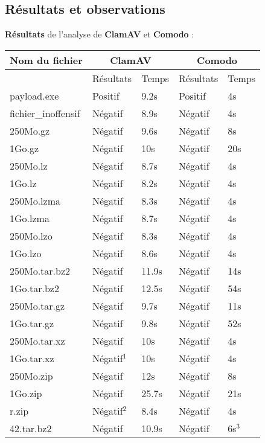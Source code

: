 \documentclass[smallextended]{svjour3}       %
\begin{document}
\subsection{Résultats et observations}
\label{3.2résultats}
\textbf{Résultats} de l'analyse de \textbf{ClamAV} et \textbf{Comodo} :\\
$ $\\
\begin{tabular}{|l|l|l|l|l|}
  \hline
  \textbf{Nom du fichier} & \multicolumn{2}{|c|}{\textbf{ClamAV}} & \multicolumn{2}{|c|}{\textbf{Comodo}}\\
  \hline
   & Résultats & Temps & Résultats & Temps \\
  \hline
  \hline
payload.exe & Positif & 9.2s & Positif & 4s\\
	\hline
fichier\_inoffensif & Négatif & 8.9s & Négatif & 4s\\
	\hline
	\hline
250Mo.gz &  Négatif  & 9.6s & Négatif & 8s\\
	\hline
1Go.gz &  Négatif  & 10s & Négatif & 20s\\
    \hline
    \hline
250Mo.lz &  Négatif  & 8.7s & Négatif & 4s\\
	\hline
1Go.lz &  Négatif & 8.2s & Négatif & 4s\\
    \hline
    \hline
250Mo.lzma &  Négatif  &  8.3s & Négatif & 4s\\
	\hline
1Go.lzma &  Négatif  & 8.7s & Négatif & 4s\\
    \hline
    \hline
250Mo.lzo &   Négatif & 8.3s & Négatif & 4s\\
	\hline
1Go.lzo &  Négatif  & 8.6s & Négatif & 4s\\
    \hline
    \hline
250Mo.tar.bz2 &  Négatif & 11.9s & Négatif & 14s\\
	\hline
1Go.tar.bz2 &  Négatif  &  12.5s & Négatif & 54s\\
    \hline
    \hline
250Mo.tar.gz &   Négatif & 9.7s & Négatif & 11s\\
	\hline
1Go.tar.gz &  Négatif  & 9.8s & Négatif & 52s\\
    \hline
    \hline
250Mo.tar.xz &  Négatif  & 10s & Négatif & 4s\\
	\hline
1Go.tar.xz &  Négatif$^1$  &  10s & Négatif & 4s\\
    \hline
    \hline
250Mo.zip &   Négatif & 12s & Négatif & 8s\\
	\hline
1Go.zip &   Négatif & 25.7s & Négatif & 21s\\
    \hline
    \hline
r.zip & Négatif$^2$ & 8.4s & Négatif & 4s\\
	\hline
42.tar.bz2 & Négatif  & 10.9s & Négatif & 6s$^3$\\
	\hline
\end{tabular}
\end{document}
